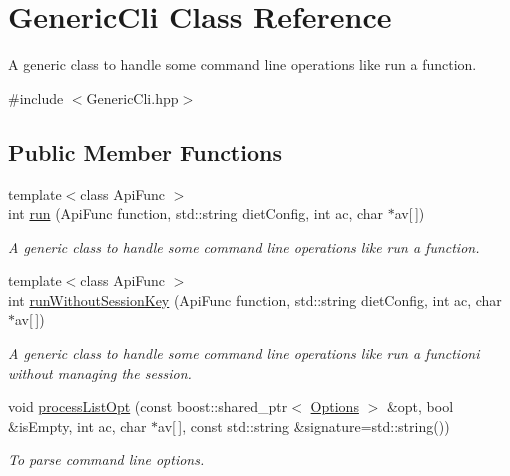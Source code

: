 \hypertarget{classGenericCli}{
\section{GenericCli Class Reference}
\label{classGenericCli}
}


A generic class to handle some command line operations like run a function.  




{\ttfamily \#include $<$GenericCli.hpp$>$}

\subsection*{Public Member Functions}
\begin{DoxyCompactItemize}
\item 
{\footnotesize template$<$class ApiFunc $>$ }\\int \hyperlink{classGenericCli_a31ed4a6d49ed4011e4f78d909bfdb17e}{run} (ApiFunc function, std::string dietConfig, int ac, char $\ast$av\mbox{[}$\,$\mbox{]})
\begin{DoxyCompactList}\small\item\em A generic class to handle some command line operations like run a function. \item\end{DoxyCompactList}\item 
{\footnotesize template$<$class ApiFunc $>$ }\\int \hyperlink{classGenericCli_aa596f6db804b7a15626dacd554c006c4}{runWithoutSessionKey} (ApiFunc function, std::string dietConfig, int ac, char $\ast$av\mbox{[}$\,$\mbox{]})
\begin{DoxyCompactList}\small\item\em A generic class to handle some command line operations like run a functioni without managing the session. \item\end{DoxyCompactList}\item 
void \hyperlink{classGenericCli_aaf69a2ace3cb9a760067747a70bbcf17}{processListOpt} (const boost::shared\_\-ptr$<$ \hyperlink{classOptions}{Options} $>$ \&opt, bool \&isEmpty, int ac, char $\ast$av\mbox{[}$\,$\mbox{]}, const std::string \&signature=std::string())
\begin{DoxyCompactList}\small\item\em To parse command line options. \item\end{DoxyCompactList}\end{DoxyCompactItemize}


